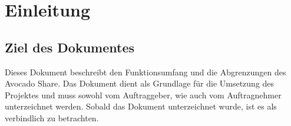 \section{Einleitung}
\subsection{Ziel des Dokumentes}
Dieses Dokument beschreibt den Funktionsumfang und die Abgrenzungen des Avocado Share. Das Dokument dient als Grundlage für die Umsetzung des Projektes und muss sowohl vom Auftraggeber, wie auch vom Auftragnehmer unterzeichnet werden. Sobald das Dokument unterzeichnet wurde, ist es als verbindlich zu betrachten.
